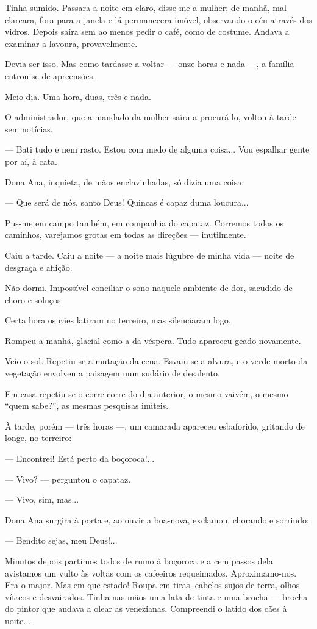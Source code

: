 Tinha sumido. Passara a noite em claro, disse-me a mulher; de manhã, mal
clareara, fora para a janela e lá permanecera imóvel, observando o céu
através dos vidros. Depois saíra sem ao menos pedir o café, como de
costume. Andava a examinar a lavoura, provavelmente.

Devia ser isso. Mas como tardasse a voltar --- onze horas e nada ---, a
família entrou-se de apreensões.

Meio-dia. Uma hora, duas, três e nada.

O administrador, que a mandado da mulher saíra a procurá-lo, voltou à
tarde sem notícias.

--- Bati tudo e nem rasto. Estou com medo de alguma coisa... Vou
espalhar gente por aí, à cata.

Dona Ana, inquieta, de mãos enclavinhadas, só dizia uma coisa:

--- Que será de nós, santo Deus! Quincas é capaz duma loucura...

Pus-me em campo também, em companhia do capataz. Corremos todos os
caminhos, varejamos grotas em todas as direções --- inutilmente.

Caiu a tarde. Caiu a noite --- a noite mais lúgubre de minha vida ---
noite de desgraça e aflição.

Não dormi. Impossível conciliar o sono naquele ambiente de dor, sacudido
de choro e soluços.

Certa hora os cães latiram no terreiro, mas silenciaram logo.

Rompeu a manhã, glacial como a da véspera. Tudo apareceu geado
novamente.

Veio o sol. Repetiu-se a mutação da cena. Esvaiu-se a alvura, e o verde
morto da vegetação envolveu a paisagem num sudário de desalento.

Em casa repetiu-se o corre-corre do dia anterior, o mesmo vaivém, o
mesmo ``quem sabe?'', as mesmas pesquisas inúteis.

À tarde, porém --- três horas ---, um camarada apareceu esbaforido,
gritando de longe, no terreiro:

--- Encontrei! Está perto da boçoroca!...

--- Vivo? --- perguntou o capataz.

--- Vivo, sim, mas...

Dona Ana surgira à porta e, ao ouvir a boa-nova, exclamou, chorando e
sorrindo:

--- Bendito sejas, meu Deus!...

Minutos depois partimos todos de rumo à boçoroca e a cem passos dela
avistamos um vulto às voltas com os cafeeiros requeimados.
Aproximamo-nos. Era o major. Mas em que estado! Roupa em tiras, cabelos
sujos de terra, olhos vítreos e desvairados. Tinha nas mãos uma lata de
tinta e uma brocha --- brocha do pintor que andava a olear as
venezianas. Compreendi o latido dos cães à noite...

